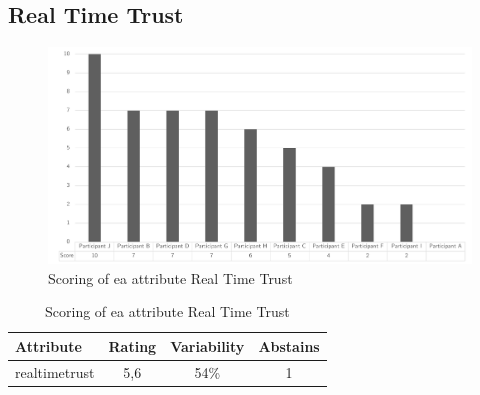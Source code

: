 \subsection{Real Time Trust}
\begin{figure}[H]
	\centering
	\includegraphics[width=0.9\linewidth]{images/scoreearealtimetrust}
	\caption[Scoring of \gls{ea} attribute Real Time Trust]{Scoring of \gls{ea} attribute Real Time Trust}
	\label{fig:appscoringearealtimetrust}
\end{figure}
\begin{table}[H]
	\centering
	\begin{tabular}{p{}ccc}
		\toprule
		\textbf{Attribute} & \textbf{Rating} & \textbf{Variability} & \textbf{Abstains} \\
		\midrule
		\Gls{realtimetrust} & 5,6 & 54\% & 1 \\%
		\bottomrule
	\end{tabular}%
	\caption[Scoring of \gls{ea} attribute Real Time Trust]{Scoring of \gls{ea} attribute Real Time Trust}
	\label{tab:appscoringearealtimetrust}%
\end{table}%
\newpage
